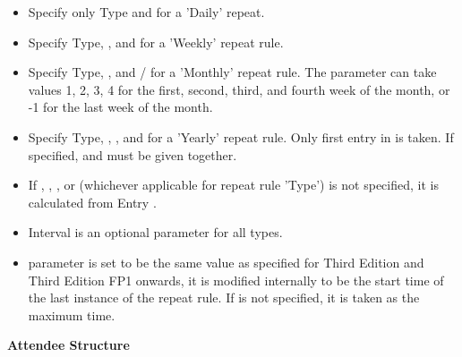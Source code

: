 \begin{notice}[note]
\begin{itemize}
\item Specify only Type and  for a 'Daily' repeat.
\item Specify Type, , and  for a 'Weekly' repeat rule.
\item Specify Type, , and  /  for a 'Monthly' repeat rule. The  parameter can take values 1, 2, 3, 4 for the first, second, third, and fourth week of the month, or -1 for the last week of the month.
\item Specify Type, , , and  for a 'Yearly' repeat rule. Only first entry in  is taken. If specified,  and  must be given together.
\item If , , , or  (whichever applicable for repeat rule 'Type') is not specified, it is calculated from Entry .
\item Interval is an optional parameter for all types.
\item {} parameter is set to be the same value as specified for Third Edition and Third Edition FP1 onwards, it is modified internally to be the start time of the last instance of the repeat rule. \break
If  is not specified, it is taken as the maximum time.
\end{itemize}
\end{notice}

{\bf Attendee Structure} \break


